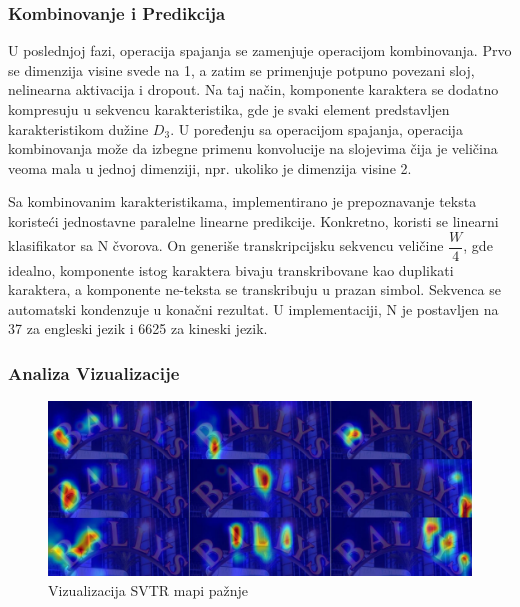 \documentclass[a4paper,12pt]{article}
\begin{document}
	\subsubsection{Kombinovanje i Predikcija}
	U poslednjoj fazi, operacija spajanja se zamenjuje operacijom kombinovanja. Prvo se dimenzija visine svede na 1, a zatim se primenjuje potpuno povezani sloj, nelinearna aktivacija i dropout. Na taj način, komponente karaktera se dodatno kompresuju u sekvencu karakteristika, gde je svaki element predstavljen karakteristikom dužine \(D_3\). U poređenju sa operacijom spajanja, operacija kombinovanja može da izbegne primenu konvolucije na slojevima čija je veličina veoma mala u jednoj dimenziji, npr. ukoliko je dimenzija visine 2.
	
	Sa kombinovanim karakteristikama, implementirano je prepoznavanje teksta koristeći jednostavne paralelne linearne predikcije. Konkretno, koristi se linearni klasifikator sa N čvorova. On generiše transkripcijsku sekvencu veličine \(\dfrac{W}{4}\), gde idealno, komponente istog karaktera bivaju transkribovane kao duplikati karaktera, a komponente ne-teksta se transkribuju u prazan simbol. Sekvenca se automatski kondenzuje u konačni rezultat. U implementaciji, N je postavljen na 37 za engleski jezik i 6625 za kineski jezik.
	
	\subsubsection{Analiza Vizualizacije}
		\begin{figure}[H]
		\centering
		\includegraphics[width=\textwidth]{assets/visualization-of-svtr-attention-maps.png}
		\caption{Vizualizacija SVTR mapi pažnje}
		\label{fig:visualization-of-svtr-attention-maps}
	\end{figure}
	
\end{document}
